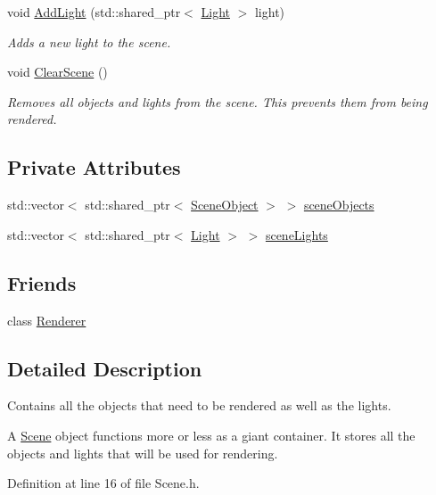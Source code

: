 \begin{DoxyCompactItemize}
void \hyperlink{class_scene_ab9b1a906b16bf867600fc3f5b734c1d4}{Add\+Light} (std\+::shared\+\_\+ptr$<$ \hyperlink{class_light}{Light} $>$ light)
\begin{DoxyCompactList}\small\item\em Adds a new light to the scene. \end{DoxyCompactList}\item 
void \hyperlink{class_scene_ac3b0f6126be07f78a61abfac3487e4df}{Clear\+Scene} ()
\begin{DoxyCompactList}\small\item\em Removes all objects and lights from the scene. This prevents them from being rendered. \end{DoxyCompactList}\end{DoxyCompactItemize}
\subsection*{Private Attributes}
\begin{DoxyCompactItemize}
\item 
std\+::vector$<$ std\+::shared\+\_\+ptr$<$ \hyperlink{class_scene_object}{Scene\+Object} $>$ $>$ \hyperlink{class_scene_a871382922b2a04d7883cf6d34529b5df}{scene\+Objects}
\item 
std\+::vector$<$ std\+::shared\+\_\+ptr$<$ \hyperlink{class_light}{Light} $>$ $>$ \hyperlink{class_scene_a847f4f9c485a56b084a1340811f0e726}{scene\+Lights}
\end{DoxyCompactItemize}
\subsection*{Friends}
\begin{DoxyCompactItemize}
\item 
class \hyperlink{class_scene_a70538530bc36e033e360880ef311df61}{Renderer}
\end{DoxyCompactItemize}


\subsection{Detailed Description}
Contains all the objects that need to be rendered as well as the lights. 

A \hyperlink{class_scene}{Scene} object functions more or less as a giant container. It stores all the objects and lights that will be used for rendering. 

Definition at line 16 of file Scene.\+h.



